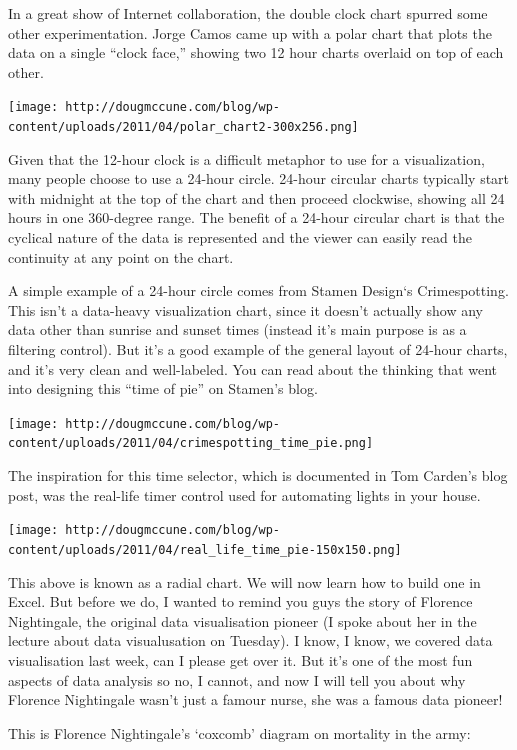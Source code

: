 \documentclass[]{book}
\theoremstyle{definition}
\theoremstyle{definition}
\theoremstyle{definition}
\theoremstyle{remark}
\begin{document}
In a great show of Internet collaboration, the double clock chart
spurred some other experimentation. Jorge Camos came up with a polar
chart that plots the data on a single ``clock face,'' showing two 12
hour charts overlaid on top of each other.

\texttt{[image: http://dougmccune.com/blog/wp-content/uploads/2011/04/polar\_chart2-300x256.png]}

Given that the 12-hour clock is a difficult metaphor to use for a
visualization, many people choose to use a 24-hour circle. 24-hour
circular charts typically start with midnight at the top of the chart
and then proceed clockwise, showing all 24 hours in one 360-degree
range. The benefit of a 24-hour circular chart is that the cyclical
nature of the data is represented and the viewer can easily read the
continuity at any point on the chart.

A simple example of a 24-hour circle comes from Stamen Design`s
Crimespotting. This isn't a data-heavy visualization chart, since it
doesn't actually show any data other than sunrise and sunset times
(instead it's main purpose is as a filtering control). But it's a good
example of the general layout of 24-hour charts, and it's very clean and
well-labeled. You can read about the thinking that went into designing
this ``time of pie'' on Stamen's blog.

\texttt{[image: http://dougmccune.com/blog/wp-content/uploads/2011/04/crimespotting\_time\_pie.png]}

The inspiration for this time selector, which is documented in Tom
Carden's blog post, was the real-life timer control used for automating
lights in your house.

\texttt{[image: http://dougmccune.com/blog/wp-content/uploads/2011/04/real\_life\_time\_pie-150x150.png]}

This above is known as a radial chart. We will now learn how to build
one in Excel. But before we do, I wanted to remind you guys the story of
Florence Nightingale, the original data visualisation pioneer (I spoke
about her in the lecture about data visualusation on Tuesday). I know, I
know, we covered data visualisation last week, can I please get over it.
But it's one of the most fun aspects of data analysis so no, I cannot,
and now I will tell you about why Florence Nightingale wasn't just a
famour nurse, she was a famous data pioneer!

This is Florence Nightingale's `coxcomb' diagram on mortality in the
army:
\end{document}
